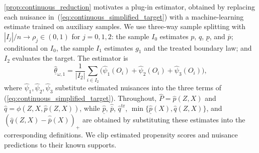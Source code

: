 \cref{prop:continuous_reduction} motivates a plug-in estimator, obtained by replacing each nuisance in~(\ref{eq:continuous_simplified_target}) with a machine-learning estimate trained on auxiliary samples. We use three-way sample splitting with $|I_j|/n\to\rho_j\in(0,1)$ for $j=0,1,2$: the sample $I_0$ estimates $p$, $q$, $\underline{p}$, and $\overline{p}$; conditional on $I_0$, the sample $I_1$ estimates $g_1$ and the treated boundary law; and $I_2$ evaluates the target. The estimator is
\begin{equation}\label{eq:estimator_continuous_instrument}
    \hat{\underline{\theta}}_{\omega, 1} = \frac{1}{|I_2|} \sum_{i \in I_2} \Big( \hat{\psi}_{1}(O_i) + \hat{\psi}_{2}(O_i) + \hat{\psi}_{3}(O_i) \Big),
\end{equation}
where $\hat\psi_1,\hat\psi_2,\hat\psi_3$ substitute estimated nuisances into the three terms of (\ref{eq:continuous_simplified_target}). Throughout, $\hat P=\hat p(Z,X)$ and $\hat q=\phi(Z,X,\hat p(Z,X))$, while $\hat{\underline p}$, $\hat{\overline p}$, $\hat q^{\mathrm{tr}}$, $\min\{\hat{\underline p}(X),\hat q(Z,X)\}$, and $(\hat q(Z,X)-\hat{\overline p}(X))_+$ are obtained by substituting these estimates into the corresponding definitions. We clip estimated propensity scores and nuisance predictions to their known supports.

